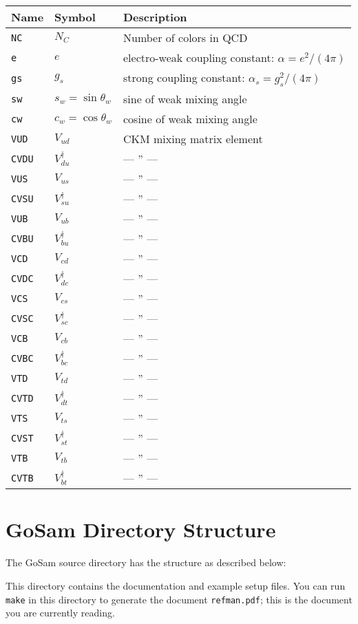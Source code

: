 \documentclass[11pt,a4paper]{refrep}
\newcommand{\gosamversion}{{2{.}0}}
\newcommand{\gosam}{{\sc GoSam}\xspace}
\newcommand{\gosamv}[1][\gosamversion]{{\sc GoSam}\xspace}
\begin{document}
\medskip
\begin{tabular}{|l|l|l|}
\hline
Name & Symbol & Description\\
\hline
\tt NC & $N_C$ & Number of colors in QCD\\
\tt e & $e$ & electro-weak coupling constant: $\alpha=e^2/(4\pi)$\\
\tt gs & $g_s$ & strong coupling constant: $\alpha_s=g_s^2/(4\pi)$\\
\tt sw & $s_w=\sin\theta_w$ & sine of weak mixing angle\\
\tt cw & $c_w=\cos\theta_w$ & cosine of weak mixing angle\\
\tt VUD & $V_{ud}$ & CKM mixing matrix element\\
\tt CVDU & $V_{du}^{\dagger}$ & --- '' ---\\
\tt VUS & $V_{us}$ & --- '' ---\\
\tt CVSU & $V_{su}^{\dagger}$ & --- '' ---\\
\tt VUB & $V_{ub}$ & --- '' ---\\
\tt CVBU & $V_{bu}^{\dagger}$ & --- '' ---\\
\tt VCD & $V_{cd}$ & --- '' ---\\
\tt CVDC & $V_{dc}^{\dagger}$ & --- '' ---\\
\tt VCS & $V_{cs}$ & --- '' ---\\
\tt CVSC & $V_{sc}^{\dagger}$ & --- '' ---\\
\tt VCB & $V_{cb}$ & --- '' ---\\
\tt CVBC & $V_{bc}^{\dagger}$ & --- '' ---\\
\tt VTD & $V_{td}$ & --- '' ---\\
\tt CVTD & $V_{dt}^{\dagger}$ & --- '' ---\\
\tt VTS & $V_{ts}$ & --- '' ---\\
\tt CVST & $V_{st}^{\dagger}$ & --- '' ---\\
\tt VTB & $V_{tb}$ & --- '' ---\\
\tt CVTB & $V_{bt}^{\dagger}$ & --- '' ---\\
\hline
\end{tabular}

\section{\gosam{} Directory Structure}
The \gosamv{} source directory has the structure as described below:

 This directory contains the documentation
and example setup files. You can run \texttt{make} in this directory
to generate the document \texttt{refman.pdf}; this is the document you
are currently reading.
\end{document}
